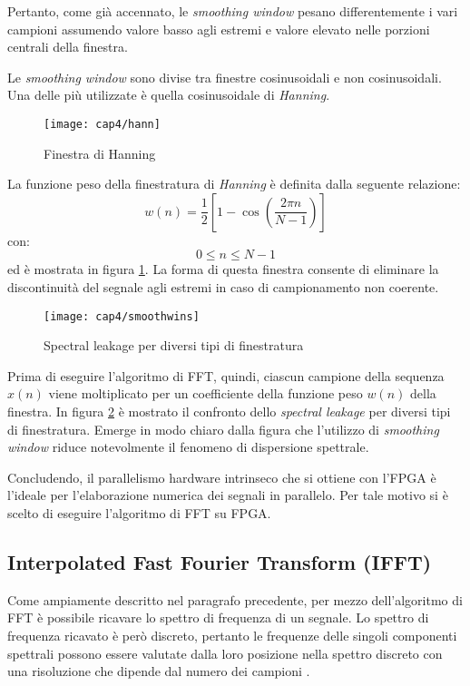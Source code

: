 Pertanto, come già accennato, le \textit{smoothing window} pesano differentemente i vari campioni assumendo valore basso agli estremi e valore elevato nelle porzioni centrali della finestra.

Le \textit{smoothing window} sono divise tra finestre cosinusoidali e non cosinusoidali. Una delle più utilizzate è quella cosinusoidale di \textit{Hanning}.
\begin{figure}  
  \begin{center}
    \texttt{[image: cap4/hann]}
    \caption{Finestra di Hanning}
    \label{hann}
  \end{center}
\end{figure}

La funzione peso della finestratura di \textit{Hanning} è definita dalla seguente relazione:
\begin{equation}
	w(n) = \frac{1}{2} \left [  1 - \cos \left ( \frac{2 \pi n}{N - 1} \right ) \right ]
\end{equation}
con:
$$ 0 \leq n \leq N-1 $$
ed è mostrata in figura \ref{hann}. La forma di questa finestra consente di eliminare la discontinuità del segnale agli estremi in caso di campionamento non coerente. 
\begin{figure}  
  \begin{center}
    \texttt{[image: cap4/smoothwins]}
    \caption{Spectral leakage per diversi tipi di finestratura}
    \label{smoothwins}
  \end{center}
\end{figure}

Prima di eseguire l'algoritmo di FFT, quindi, ciascun campione della sequenza $x(n)$ viene moltiplicato per un coefficiente della funzione peso $w(n)$ della finestra. 
In figura \ref{smoothwins} è mostrato il confronto dello \textit{spectral leakage} per diversi tipi di finestratura. Emerge in modo chiaro dalla figura che l'utilizzo di \textit{smoothing window} riduce notevolmente il fenomeno di dispersione spettrale.

Concludendo, il parallelismo hardware intrinseco che si ottiene con l'FPGA è l'ideale per l'elaborazione numerica dei segnali in parallelo. Per tale motivo si è scelto di eseguire l'algoritmo di FFT su FPGA.

\subsection{Interpolated Fast Fourier Transform (IFFT)}
Come ampiamente descritto nel paragrafo precedente, per mezzo dell'algoritmo di FFT è possibile ricavare lo spettro di frequenza di un segnale. Lo spettro di frequenza ricavato è però discreto, pertanto le frequenze delle singoli componenti spettrali possono essere valutate dalla loro posizione nella spettro discreto con una risoluzione che dipende dal numero dei campioni \cite{31004}.

